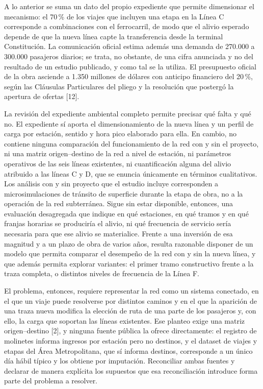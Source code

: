 \documentclass{article}
\begin{document}
A lo anterior se suma un dato del propio expediente que permite dimensionar el
mecanismo: el 70\,\% de los viajes que incluyen una etapa en la Línea C corresponde a combinaciones con el
ferrocarril, de modo que el alivio esperado depende de que la nueva línea capte la transferencia desde la
terminal Constitución. La comunicación oficial estima además una demanda de 270.000 a 300.000 pasajeros
diarios; se trata, no obstante, de una cifra anunciada y no del resultado de un estudio publicado, y como
tal se la utiliza. El
presupuesto oficial de la obra asciende a 1.350 millones de dólares con anticipo financiero del 20\,\%, según
las Cláusulas Particulares del pliego y la resolución que postergó la apertura de ofertas [12].

La revisión del expediente ambiental completo
permite precisar qué falta y qué no. El expediente sí aporta el dimensionamiento de la nueva línea y un
perfil de carga por estación, sentido y hora pico elaborado para ella. En cambio, no contiene ninguna
comparación del funcionamiento de la red con y sin el proyecto, ni una matriz origen--destino de la red a
nivel de estación, ni parámetros operativos de las seis líneas existentes, ni cuantificación alguna del
alivio atribuido a las líneas C y D, que se enuncia únicamente en términos cualitativos. Los análisis con y
sin proyecto que el estudio incluye corresponden a microsimulaciones de tránsito de superficie durante la
etapa de obra, no a la operación de la red subterránea. Sigue sin estar disponible, entonces, una evaluación
desagregada que indique en qué estaciones, en qué tramos y en qué franjas horarias se produciría el alivio,
ni qué frecuencia de servicio sería necesaria para que ese alivio se materialice. Frente a una inversión de
esa magnitud y a un plazo de obra de varios años, resulta razonable disponer de un modelo que permita
comparar el desempeño de la red con y sin la nueva línea, y que además permita explorar variantes: el primer
tramo constructivo frente a la traza completa, o distintos niveles de frecuencia de la Línea F.

El problema, entonces, requiere representar la red
como un sistema conectado, en el que un viaje puede resolverse por distintos caminos y en el que la
aparición de una traza nueva modifica la elección de ruta de una parte de los pasajeros y, con ello, la
carga que soportan las líneas existentes. Ese planteo exige una matriz origen--destino [2], y ninguna fuente
pública la ofrece directamente: el registro de molinetes informa ingresos por estación pero no destinos, y
el dataset de viajes y etapas del Área Metropolitana, que sí informa destinos, corresponde a un único día
hábil típico y los obtiene por imputación. Reconciliar ambas fuentes y declarar de manera explícita los
supuestos que esa reconciliación introduce forma parte del problema a resolver.
\end{document}
